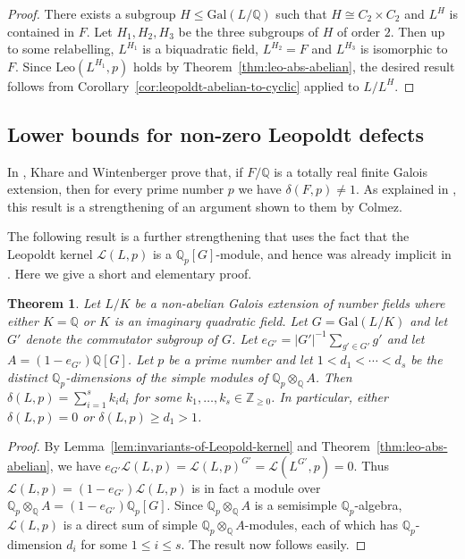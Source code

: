 \documentclass[12pt]{amsart}
\theoremstyle{plain}
\newtheorem{theorem}{Theorem}[section]
\theoremstyle{remark}
\theoremstyle{definition}
\newcommand{\Z}{\mathbb{Z}}
\newcommand{\Q}{\mathbb{Q}}
\newcommand{\Gal}{\mathrm{Gal}}
\newcommand{\Leo}{\mathrm{Leo}}
\numberwithin{equation}{section}
\begin{document}
\begin{proof}
There exists a subgroup $H \leq \Gal(L/\Q)$ such that $H \cong C_{2} \times C_{2}$
and $L^{H}$ is contained in $F$.
Let $H_{1},H_{2},H_{3}$ be the three subgroups of $H$ of order $2$. 
Then up to some relabelling, $L^{H_{1}}$ is a biquadratic field, $L^{H_{2}}=F$ and $L^{H_{3}}$ is isomorphic to $F$. Since $\Leo(L^{H_{1}},p)$ holds by Theorem~\ref{thm:leo-abs-abelian}, the desired result follows
from Corollary~\ref{cor:leopoldt-abelian-to-cyclic} applied to $L/L^{H}$.
\end{proof}

\subsection{Lower bounds for non-zero Leopoldt defects}\label{subsec:defect-lower-bound}
In \cite[Proposition A.1]{MR3158531}, Khare and Wintenberger prove that,
if $F/\Q$ is a totally real finite Galois extension, then for every prime number 
$p$ we have $\delta(F,p) \neq 1$. 
As explained in \cite[Appendix]{MR3158531}, this
result is a strengthening of an argument shown to them by Colmez.

The following result is a further strengthening that 
uses the fact that the Leopoldt kernel $\mathcal{L}(L,p)$ is a $\Q_{p}[G]$-module, 
and hence was already implicit in \cite{MR659620,MR1087978}.
Here we give a short and elementary proof.

\begin{theorem}\label{thm:lower-bound-on-defects}
Let $L/K$ be a non-abelian Galois extension of number fields where either $K=\Q$ 
or $K$ is an imaginary quadratic field.
Let $G=\Gal(L/K)$ and let $G'$ denote the commutator subgroup of $G$.
Let $e_{G'} = |G'|^{-1} \sum_{g' \in G'} g'$ and let $A = (1-e_{G'})\Q[G]$.
Let $p$ be a prime number and let $1 < d _{1} < \cdots < d_{s}$ be the distinct $\Q_{p}$-dimensions
of the simple modules of $\Q_{p} \otimes_{\Q} A$.
Then $\delta(L,p)=\sum_{i=1}^{s} k_{i}d_{i}$ for some $k_{1}, \ldots, k_{s} \in \Z_{\geq 0}$.
In particular, either $\delta(L,p)=0$ or $\delta(L,p) \geq d_{1}>1$.
\end{theorem}

\begin{proof}
By Lemma~\ref{lem:invariants-of-Leopold-kernel} and Theorem~\ref{thm:leo-abs-abelian}, we have
$e_{G'}\mathcal{L}(L,p) = \mathcal{L}(L,p)^{G'} = \mathcal{L}(L^{G'},p) = 0$.
Thus $\mathcal{L}(L,p)=(1-e_{G'})\mathcal{L}(L,p)$ is in fact a module over 
$\Q_{p} \otimes_{\Q} A = (1-e_{G'})\Q_{p}[G]$.
Since $\Q_{p} \otimes_{\Q} A$ is a semisimple $\Q_{p}$-algebra,
$\mathcal{L}(L,p)$ is a direct sum of simple $\Q_{p} \otimes_{\Q} A$-modules, 
each of which has $\Q_{p}$-dimension $d_{i}$ for some $1 \leq i \leq s$.
The result now follows easily.
\end{proof}
\end{document}
